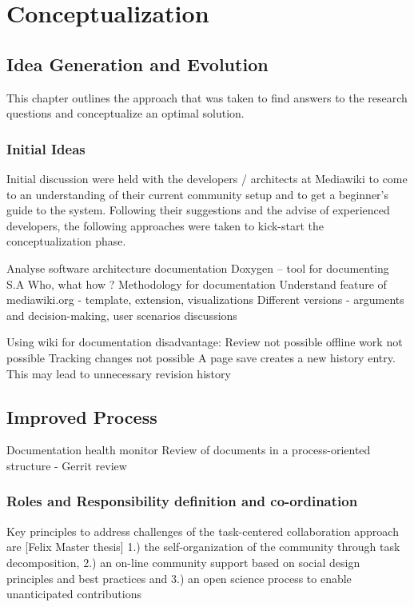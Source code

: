 \chapter{Conceptualization}\label{chapter:Conceptualization}

\section{Idea Generation and Evolution}
\indent This chapter outlines the approach that was taken to find answers to the research questions and conceptualize an optimal solution.

\subsection{Initial Ideas}
\indent Initial discussion were held with the developers / architects at Mediawiki to come to an understanding of their current community setup and to get a beginner's guide to the system. Following their suggestions and the advise of experienced developers, the following approaches were taken to kick-start the conceptualization phase.
 
Analyse software architecture documentation
Doxygen – tool for documenting S.A
Who, what how ?
Methodology for documentation
Understand feature of mediawiki.org - template, extension, visualizations
Different versions - arguments and decision-making, user scenarios discussions



Using wiki for documentation disadvantage:
Review not possible
offline work not possible
Tracking changes not possible
A page save creates a new history entry. This may lead to unnecessary revision history 



\section{Improved Process}
Documentation health monitor
Review of documents in a process-oriented structure - Gerrit review 

\subsection{Roles and Responsibility definition and co-ordination}

Key principles to address challenges of the task-centered collaboration approach are [Felix Master thesis]
1.) the self-organization of the community through task decomposition, 
2.) an on-line community support based on social design principles and best practices and
 3.) an open science process to enable unanticipated contributions

